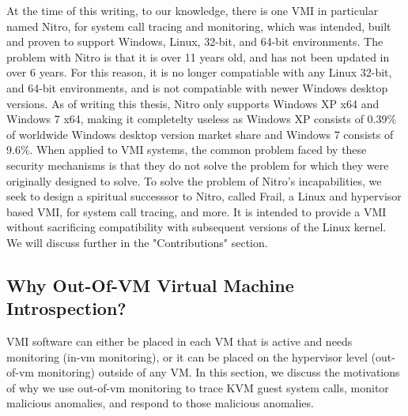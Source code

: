 \documentclass{report}
\begin{document}
\begin{spacing}{1.5}
{\large
At the time of this writing, to our knowledge, there is one VMI in particular named Nitro, for system call tracing and monitoring, which was intended, built and proven to support Windows, Linux, 32-bit, and 64-bit environments. The problem with Nitro is that it is over 11 years old, and has not been updated in over 6 years. For this reason, it is no longer compatiable with any Linux 32-bit, and 64-bit environments, and is not compatiable with newer Windows desktop versions. As of writing this thesis, Nitro only supports Windows XP x64 and Windows 7 x64, making it completelty useless as Windows XP consists of 0.39\%  of worldwide Windows desktop version market share and Windows 7 consists of 9.6\%. When applied to VMI systems, the common problem faced by these security mechanisms is that they do not solve the problem for which they were originally designed to solve. To solve the problem of Nitro's incapabilities, we seek to design a spiritual successsor to Nitro, called Frail, a Linux and hypervisor based VMI, for system call tracing, and more. It is intended to provide a VMI without sacrificing compatibility with subsequent versions of the Linux kernel. We will discuss further in the "Contributions" section.
\newline
}

















\subsection{Why Out-Of-VM Virtual Machine Introspection?}

{\large
VMI software can either be placed in each VM that is active and needs monitoring (in-vm monitoring), or it can be placed on the hypervisor level (out-of-vm monitoring) outside of any VM. In this section, we discuss the motivations of why we use out-of-vm monitoring to trace KVM guest system calls, monitor malicious anomalies, and respond to those malicious anomalies.
\newline
}


\end{spacing}
\end{document}
